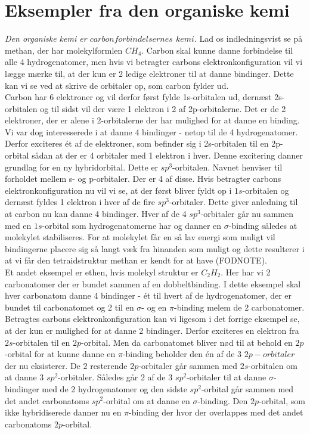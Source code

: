 \section{Eksempler fra den organiske kemi}

\emph{Den organiske kemi er $carbonforbindelsernes$ $kemi$}. Lad os indledningsvist se på methan, der har molekylformlen $CH_4$. Carbon skal kunne danne forbindelse til alle 4 hydrogenatomer, men hvis vi betragter carbons elektronkonfiguration vil vi lægge mærke til, at der kun er 2 ledige elektroner til at danne bindinger. Dette kan vi se ved at skrive de orbitaler op, som carbon fylder ud.
\\
Carbon har 6 elektroner og vil derfor først fylde 1s-orbitalen ud, dernæst 2s-orbitalen og til sidst vil der være 1 elektron i 2 af 2p-orbitalerne. Det er de 2 elektroner, der er alene i 2-orbitalerne der har mulighed for at danne en binding. Vi var dog interesserede i at danne 4 bindinger - netop til de 4 hydrogenatomer. Derfor exciteres ét af de elektroner, som befinder sig i 2s-orbitalen til en 2p-orbital sådan at der er 4 orbitaler med 1 elektron i hver. Denne excitering danner grundlag for en ny hybridorbital. Dette er $sp^3$-orbitalen. Navnet henviser til forholdet mellem s- og p-orbitaler. Der er 4 af disse. Hvis betragter carbons elektronkonfiguration nu vil vi se, at der først bliver fyldt op i $1s$-orbitalen og dernæst fyldes 1 elektron i hver af de fire $sp^3$-orbitaler. Dette giver anledning til at carbon nu kan danne 4 bindinger. Hver af de 4 $sp^3$-orbitaler går nu sammen med en $1s$-orbital som hydrogenatomerne har og danner en $\sigma$-binding således at molekylet stabiliseres. For at molekylet får en så lav energi som muligt vil bindingerne placere sig så langt væk fra hinanden som muligt og dette resulterer i at vi får den tetraidstruktur methan er kendt for at have (FODNOTE). 
\\
Et andet eksempel er ethen, hvis molekyl struktur er $C_{2}H_2$. Her har vi 2 carbonatomer der er bundet sammen af en dobbeltbinding. I dette eksempel skal hver carbonatom danne 4 bindinger - ét til hvert af de hydrogenatomer, der er bundet til carbonatomet og 2 til en $\sigma$- og en $\pi$-binding melem de 2 carbonatomer. Betragtes carbons elektronkonfiguration kan vi ligesom i det forrige eksempel se, at der kun er mulighed for at danne 2 bindinger. Derfor exciteres en elektron fra $2s$-orbitalen til en $2p$-orbital. Men da carbonatomet bliver nød til at behold en $2p$-orbital for at kunne danne en $\pi$-binding beholder den én af de 3 $2p-orbitaler$ der nu eksisterer. De 2 resterende $2p$-orbitaler går sammen med $2s$-orbitalen om at danne 3 $sp^{2}$-orbitaler. Således går 2 af de 3 $sp^2$-orbitaler til at danne $\sigma$-bindinger med de 2 hydrogenatomer og den sidste $sp^2$-orbital går sammen med det andet carbonatoms $sp^2$-orbital om at danne en $\sigma$-binding. Den $2p$-orbital, som ikke hybridiserede danner nu en $\pi$-binding der hvor der overlappes med det andet carbonatoms $2p$-orbital. 

